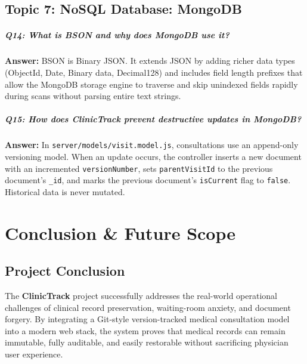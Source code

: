 \documentclass[12pt,a4paper,oneside]{report}
\begin{document}
\section{Topic 7: NoSQL Database: MongoDB}
\paragraph{Q14: What is BSON and why does MongoDB use it?}
\textbf{Answer:} BSON is Binary JSON. It extends JSON by adding richer data types (ObjectId, Date, Binary data, Decimal128) and includes field length prefixes that allow the MongoDB storage engine to traverse and skip unindexed fields rapidly during scans without parsing entire text strings.

\paragraph{Q15: How does ClinicTrack prevent destructive updates in MongoDB?}
\textbf{Answer:} In \texttt{server/models/visit.model.js}, consultations use an append-only versioning model. When an update occurs, the controller inserts a new document with an incremented \texttt{versionNumber}, sets \texttt{parentVisitId} to the previous document's \texttt{\_id}, and marks the previous document's \texttt{isCurrent} flag to \texttt{false}. Historical data is never mutated.

\chapter{Conclusion \& Future Scope}

\section{Project Conclusion}
The \textbf{ClinicTrack} project successfully addresses the real-world operational challenges of clinical record preservation, waiting-room anxiety, and document forgery. By integrating a Git-style version-tracked medical consultation model into a modern web stack, the system proves that medical records can remain immutable, fully auditable, and easily restorable without sacrificing physician user experience.
\end{document}
